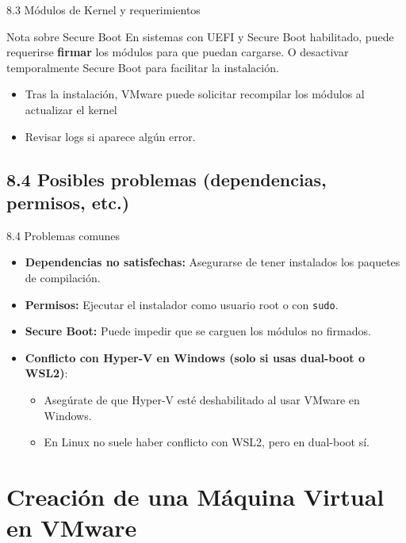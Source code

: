 \documentclass{beamer}
\begin{document}
\begin{frame}{8.3 Módulos de Kernel y requerimientos}
	\begin{block}{Nota sobre Secure Boot}
		En sistemas con UEFI y Secure Boot habilitado, puede requerirse \textbf{firmar} los módulos para que puedan cargarse.  
		O desactivar temporalmente Secure Boot para facilitar la instalación.
	\end{block}
	\begin{itemize}
		\item Tras la instalación, VMware puede solicitar recompilar los módulos al actualizar el kernel
		\item Revisar logs si aparece algún error.
	\end{itemize}
\end{frame}

\subsection{8.4 Posibles problemas (dependencias, permisos, etc.)}
\begin{frame}{8.4 Problemas comunes}
	\begin{itemize}
	\item \textbf{Dependencias no satisfechas:} Asegurarse de tener instalados los paquetes de compilación.
	\item \textbf{Permisos:} Ejecutar el instalador como usuario root o con \texttt{sudo}.
	\item \textbf{Secure Boot:} Puede impedir que se carguen los módulos no firmados.
	\item \textbf{Conflicto con Hyper-V en Windows (solo si usas dual-boot o WSL2)}:
		\begin{itemize}
			\item Asegúrate de que Hyper-V esté deshabilitado al usar VMware en Windows.  
			\item En Linux no suele haber conflicto con WSL2, pero en dual-boot sí.
		\end{itemize}
	\end{itemize}
\end{frame}

\section{Creación de una Máquina Virtual en VMware}
\end{document}
